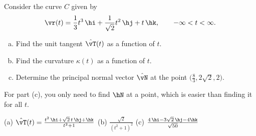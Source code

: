 \begin{question}[M317 2008A] %
Consider the curve $C$ given by
\begin{equation*}
\vr(t) = \frac{1}{3} t^3\,\hi + \frac{1}{\sqrt{2}} t^2\,\hj + t\,\hk,\qquad
-\infty < t < \infty.
\end{equation*}
\begin{enumerate}[(a)]
\item
Find the unit tangent $\hat\vT(t)$ as a function of $t$.
\item
Find the curvature $\kappa(t)$ as a function of $t$.
\item
Determine the principal normal vector $\hat\vN$ at the point 
$\big(\frac{8}{3} , 2\sqrt{2}, 2\big)$.
\end{enumerate}
\end{question}

\begin{hint} 
For part (c), you only need to find $\hN$ at a point, which is easier than finding it for all $t$.
\end{hint}

\begin{answer} 
(a) $\hat\vT(t) = \frac{t^2\,\hi +\sqrt{2}\,t\,\hj +\hk}{t^2+1}$\qquad
(b) $\frac{\sqrt{2}} {{(t^2+1)}^2}$\qquad
(c) $\frac{4\,\hi -3\sqrt{2}\,\hj -4\hk}{\sqrt{50}}$
\end{answer}


